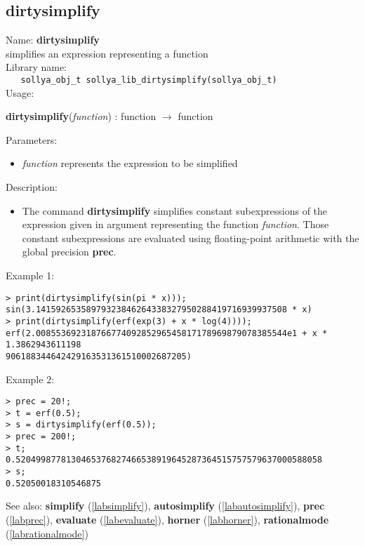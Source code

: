 \subsection{dirtysimplify}
\label{labdirtysimplify}
\noindent Name: \textbf{dirtysimplify}\\
\phantom{aaa}simplifies an expression representing a function\\[0.2cm]
\noindent Library name:\\
\verb|   sollya_obj_t sollya_lib_dirtysimplify(sollya_obj_t)|\\[0.2cm]
\noindent Usage: 
\begin{center}
\textbf{dirtysimplify}(\emph{function}) : \textsf{function} $\rightarrow$ \textsf{function}\\
\end{center}
Parameters: 
\begin{itemize}
\item \emph{function} represents the expression to be simplified
\end{itemize}
\noindent Description: \begin{itemize}

\item The command \textbf{dirtysimplify} simplifies constant subexpressions of the
   expression given in argument representing the function
   \emph{function}. Those constant subexpressions are evaluated using
   floating-point arithmetic with the global precision \textbf{prec}.
\end{itemize}
\noindent Example 1: 
\begin{center}\begin{minipage}{15cm}\begin{Verbatim}[frame=single]
> print(dirtysimplify(sin(pi * x)));
sin(3.14159265358979323846264338327950288419716939937508 * x)
> print(dirtysimplify(erf(exp(3) + x * log(4))));
erf(2.00855369231876677409285296545817178969879078385544e1 + x * 1.3862943611198
906188344642429163531361510002687205)
\end{Verbatim}
\end{minipage}\end{center}
\noindent Example 2: 
\begin{center}\begin{minipage}{15cm}\begin{Verbatim}[frame=single]
> prec = 20!;
> t = erf(0.5);
> s = dirtysimplify(erf(0.5));
> prec = 200!;
> t;
0.5204998778130465376827466538919645287364515757579637000588058
> s;
0.52050018310546875
\end{Verbatim}
\end{minipage}\end{center}
See also: \textbf{simplify} (\ref{labsimplify}), \textbf{autosimplify} (\ref{labautosimplify}), \textbf{prec} (\ref{labprec}), \textbf{evaluate} (\ref{labevaluate}), \textbf{horner} (\ref{labhorner}), \textbf{rationalmode} (\ref{labrationalmode})
